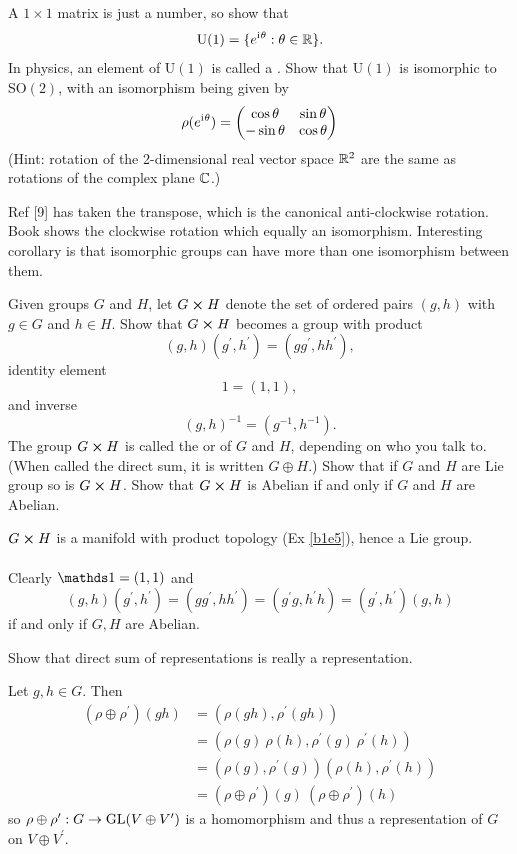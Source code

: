 \documentclass[10pt]{article}
\begin{document}
\begin{example}
	A $1 \times 1$ matrix is just a number, so show that
	$$
	\text{U}(1)=\lbrace e^{\mathrm{i}\mkern1mu \theta}:\theta \in \mathbb{R}\rbrace.
	$$
	In physics, an element of U$(1)$ is called a . Show that U$(1)$ is isomorphic to SO$(2)$, with an isomorphism being given by
	$$
	\rho(e^{\mathrm{i}\mkern1mu \theta}) = \begin{pmatrix}
		\cos\theta&\sin\theta\\
		-\sin\theta&\cos\theta
	\end{pmatrix}
	$$
	(Hint: rotation of the 2-dimensional real vector space $\mathbb{R}^2$ are the same as rotations of the complex plane $\mathbb{C}$.)
\end{example}
\sol Ref [9] has taken the transpose, which is the canonical anti-clockwise rotation. Book shows the clockwise rotation which equally an isomorphism. Interesting corollary is that isomorphic groups can have more than one isomorphism between them.


\begin{example}
	Given groups $G$ and $H$, let $G \cross H$ denote the set of ordered pairs $(g, h)$ with $g \in G$ and $h \in H$. Show that $G \cross H$ becomes a group with product
	$$
	(g,h)(g^\prime, h^\prime) = (gg^\prime,hh^\prime),
	$$
	identity element
	$$
	1=(1,1),
	$$
	and inverse
	$$
	(g,h)^{-1}=(g^{-1},h^{-1}).
	$$
	The group $G \cross H$ is called the  or  of $G$ and $H$, depending on who you talk to. (When called the direct sum, it is written $G \oplus H$.) Show that if $G$ and $H$ are Lie group so is $G \cross H$. Show that $G \cross H$ is Abelian if and only if $G$ and $H$ are Abelian.
\end{example}
\sol $G \cross H$ is a manifold with product topology (Ex \ref{b1e5}), hence a Lie group.\\\\
Clearly $\id = (1,1)$ and
$$
(g,h)(g^\prime, h^\prime) = (gg^\prime,hh^\prime) = (g^\prime g, h^\prime h) = (g^\prime, h^\prime) (g,h)
$$
if and only if $G, H$ are Abelian.


\begin{example}\label{b2e11}
	Show that direct sum of representations is really a representation.
\end{example}
\sol Let $g,h \in G$. Then
$$
\begin{aligned}
	(\rho \oplus \rho^\prime)(gh) &= (\rho(gh), \rho^\prime(gh))\\
	&= (\rho(g)\:\rho(h), \rho^\prime(g)\:\rho^\prime(h))\\
	&= (\rho(g), \rho^\prime(g))(\rho(h), \rho^\prime(h))\\
	&= (\rho \oplus \rho^\prime)(g)\:(\rho \oplus \rho^\prime)(h)
\end{aligned}
$$ 
so $\rho \oplus \rho^\prime: G \to \text{GL}(V \oplus V^\prime)$ is a homomorphism and thus a representation of $G$ on $V \oplus V^\prime$.
\end{document}
